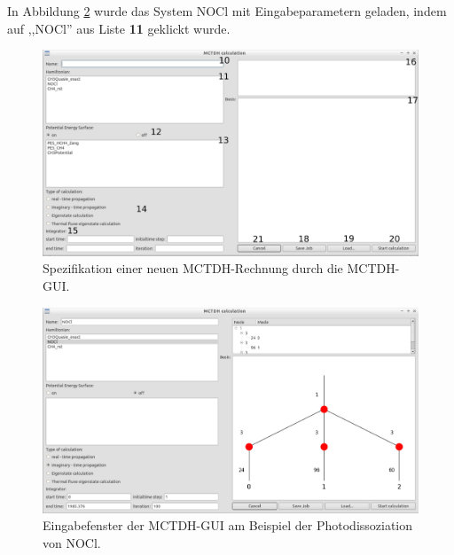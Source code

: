 In Abbildung \ref{fig:workflow5} wurde das System NOCl mit Eingabeparametern geladen,
indem auf ,,NOCl'' aus Liste \textbf{11} geklickt wurde.

\begin{figure}
    \centering
    \includegraphics[angle=90, scale=0.45]{figures/screenWidgetA}
    \caption{Spezifikation einer neuen MCTDH-Rechnung durch die MCTDH-GUI.}\label{fig:workflow4}
\end{figure}
\begin{figure}
    \centering
    \includegraphics[angle=90, scale=0.45]{figures/screenWidgetAexample}
    \caption{Eingabefenster der MCTDH-GUI am Beispiel der
    Photodissoziation von NOCl.}\label{fig:workflow5}
\end{figure}
